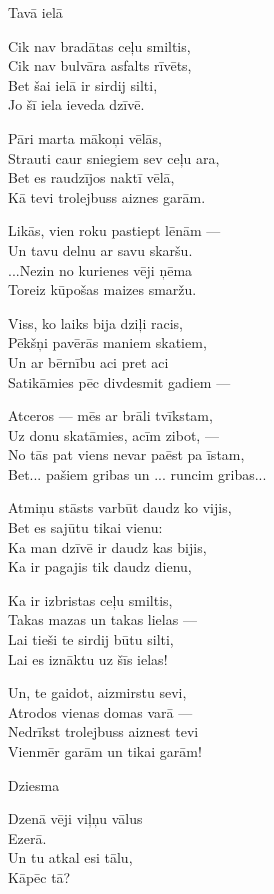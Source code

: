 \documentclass[14pt]{extarticle}
\begin{document}
{{\newpage

{\large \sc Tavā ielā}

Cik nav bradātas ceļu smiltis,\\
Cik nav bulvāra asfalts rīvēts,\\
Bet šai ielā ir sirdij silti,\\
Jo šī iela ieveda dzīvē. 

Pāri marta mākoņi vēlās,\\
Strauti caur sniegiem sev ceļu ara,\\
Bet es raudzījos naktī vēlā,\\
Kā tevi trolejbuss aiznes garām. 

Likās, vien roku pastiept lēnām ---\\
Un tavu delnu ar savu skaršu.\\
...Nezin no kurienes vēji ņēma\\
Toreiz kūpošas maizes smaržu.

Viss, ko laiks bija dziļi racis,\\
Pēkšņi pavērās maniem skatiem,\\
Un ar bērnību aci pret aci\\
Satikāmies pēc divdesmit gadiem ---

Atceros --- mēs ar brāli tvīkstam,\\
Uz donu skatāmies, acīm zibot, ---\\
No tās pat viens nevar paēst pa īstam,\\
Bet... pašiem gribas un ... runcim gribas...

Atmiņu stāsts varbūt daudz ko vijis,\\
Bet es sajūtu tikai vienu:\\
Ka man dzīvē ir daudz kas bijis,\\
Ka ir pagajis tik daudz dienu,

Ka ir izbristas ceļu smiltis,\\
Takas mazas un takas lielas ---\\
Lai tieši te sirdij būtu silti,\\
Lai es iznāktu uz šīs ielas!

Un, te gaidot, aizmirstu sevi,\\
Atrodos vienas domas varā ---\\
Nedrīkst trolejbuss aiznest tevi\\
Vienmēr garām un tikai garām!


\newpage

{\large \sc Dziesma}

Dzenā vēji viļņu vālus\\
\mbox{}\hspace{10pt} Ezerā.\\
Un tu atkal esi tālu,\\
\mbox{}\hspace{10pt} Kāpēc tā?

}}
\end{document}
